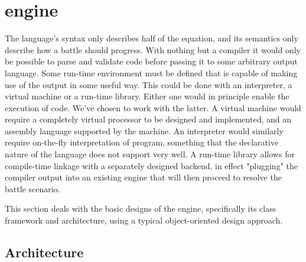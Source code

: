 \section{\langname{} engine}
The language's syntax only describes half of the equation, and its semantics only describe how a battle should progress. With nothing but a compiler it would only be possible to parse and validate code before passing it to some arbitrary output language. Some run-time environment must be defined that is capable of making use of the output in some useful way. This could be done with an interpreter, a virtual machine or a run-time library. Either one would in principle enable the execution of code. We've chosen to work with the latter. A virtual machine would require a completely virtual processor to be designed and implemented, and an assembly language supported by the machine. An interpreter would similarly require on-the-fly interpretation of program, something that the declarative nature of the language does not support very well. A run-time library allows for compile-time linkage with a separately designed backend, in effect "plugging" the \langname{} compiler output into an existing engine that will then proceed to resolve the battle scenario.

This section deals with the basic designs of the engine, specifically its class framework and architecture, using a typical object-oriented design approach.

\subsection*{Architecture}

